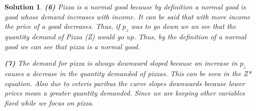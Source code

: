 \documentclass{article} %
\theoremstyle{quest}
\newtheorem*{solution}{Solution}
\begin{document}
\begin{solution}
\smallskip

\textbf{(6)}
Pizza is a normal good because by definition a normal good is good whose 
demand increases with income. It can be said that with more income the price
of a good decreases. Thus, if $p_z$ was to go down we an see that the 
quantity demand of Pizza (Z) would go up. Thus, by the definition of a 
normal good we can see that pizza is a normal good.

\smallskip

\textbf{(7)}
The demand for pizza is always downward sloped because an increase in $p_z$ causes 
a decrease in the quantity demanded of pizzas. This can be seen in the Z* equation.
Also due to ceteris paribus the curve slopes downwards because lower prices mean 
a greater quantity demanded. Since we are keeping other variables fixed while we focus on pizza.
\end{solution}
\end{document}
